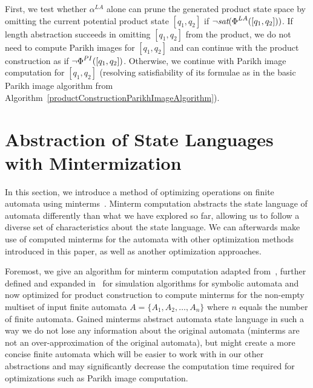 First, we test whether $\alpha^{LA}$ alone can prune the generated product state space by omitting the current potential product state $[q_1, q_2]$ if $\neg \emph{sat}(\emph{$\Phi$}^{LA}([q_1, q_2]))$. If length abstraction succeeds in omitting $[q_1, q_2]$ from the product, we do not need to compute Parikh images for $[q_1, q_2]$ and can continue with the product construction as if $\neg \emph{$\Phi$}^{PI}([q_1, q_2])$. Otherwise, we continue with Parikh image computation for $[q_1, q_2]$ (resolving satisfiability of its formulae as in the basic Parikh image algorithm from Algorithm~\ref{productConstructionParikhImageAlgorithm}).


\section{Abstraction of State Languages with Mintermization}

In this section, we introduce a method of optimizing operations on finite automata using minterms~\cite{minterms-10.1007/978-3-642-18275-4_18}. Minterm computation abstracts the state language of automata differently than what we have explored so far, allowing us to follow a diverse set of characteristics about the state language. We can afterwards make use of computed minterms for the automata with other optimization methods introduced in this paper, as well as another optimization approaches.

Foremost, we give an algorithm for minterm computation adapted from~\cite{minterm_computation-Dantoni2014MinimizationOS}, further defined and expanded in~\cite{minterms_forms-FITPUB11801} for simulation algorithms for symbolic automata and now optimized for product construction to compute minterms for the non-empty multiset of input finite automata $A = \{A_1, A_2, \dots, A_n\}$ where $n$ equals the number of finite automata. Gained minterms abstract automata state language in such a way we do not lose any information about the original automata (minterms are not an over-approximation of the original automata), but might create a more concise finite automata which will be easier to work with in our other abstractions and may significantly decrease the computation time required for optimizations such as Parikh image computation.

